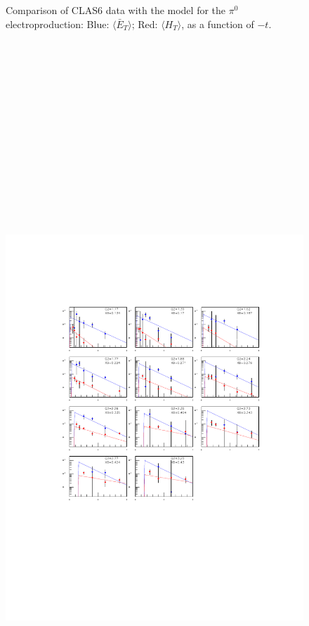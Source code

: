 \documentclass[prc,floatfix,superscriptaddress]{revtex4}
\newcommand{\GPDHT}{\langle H_T \rangle}
\newcommand{\GPDETbar}{\langle \bar{E}_T \rangle}
\begin{document}
\begin{figure}[t!]
{}
\label{pi0_gff}
\vspace*{-70mm}
\caption{Comparison of CLAS6 data with the model for the $\pi^0$ electroproduction:
Blue: $\GPDETbar$;
Red: $\GPDHT$,  as a function of $-t$.
}
\label{fig:pi0_gff}
\end{figure}


\begin{figure}[t!]
\vspace*{-10 mm}
\centerline{
\includegraphics[height=30cm]{../Test_plots/eta_HT2_ET2.pdf}
}
\end{figure}
\end{document}
